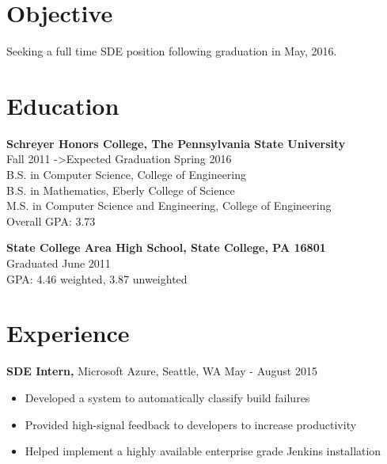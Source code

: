 \documentclass[margin]{res}
\begin{document}
 
\address{{\bf Present Address} \\ 523 Broadway E \\ Apartment 329 \\ Seattle, WA 98102 \\
        (814) 574-8768 }
\address{{\bf Permanent Address} \\ 159 Hemlock Hill Rd \\ State College, PA 16803 \\ douglasjordan0@gmail.com } 
\begin{resume} 
 
\section{Objective} 
Seeking a full time SDE position following graduation in May, 2016.

\section{Education} 
{\bf Schreyer Honors College, The Pennsylvania State University} \\
Fall 2011 -\textgreater Expected Graduation Spring 2016 \\
B.S. in Computer Science, College of Engineering \\
B.S. in Mathematics, Eberly College of Science \\
M.S. in Computer Science and Engineering, College of Engineering \\
Overall GPA: 3.73

{\bf State College Area High School, State College, PA 16801} \\
Graduated June 2011 \\
GPA: 4.46 weighted, 3.87 unweighted

\section{Experience}

{\bf SDE Intern,} Microsoft Azure, Seattle, WA \hfill May - August 2015
\begin{itemize} \itemsep -2pt  %
\item Developed a system to automatically classify build failures
\item Provided high-signal feedback to developers to increase productivity
\item Helped implement a highly available enterprise grade Jenkins installation
\end{itemize}


\end{resume}
\end{document}
